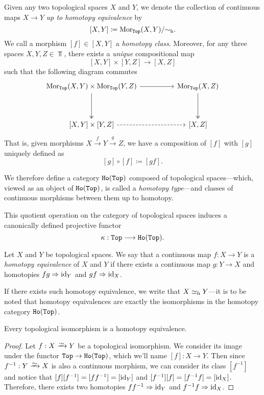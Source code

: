 Given any two topological spaces \(X\) and \(Y\), we denote the
collection of continuous maps \(X \to Y\) \emph{up to homotopy equivalence} by
\[
[X, Y] \coloneq \operatorname{Mor}_{{\texttt{Top}}}(X, Y)/{\sim_{\text{h}}}.
\]
We call a morphism \([f] \in [X, Y]\) a \emph{homotopy class}. Moreover, for any
three spaces \(X, Y, Z \in \Top\), there exists a \emph{unique} compositional
map
\[
[X, Y] \times [Y, Z] \longrightarrow [X, Z]
\]
such that the following diagram commutes
\[
\begin{tikzcd}
\Hom_{\Top}(X, Y) \times \Hom_{\Top}(Y, Z)
\ar[rr] \ar[dd, two heads]
&&\Hom_{\Top}(X, Z) \ar[dd, two heads]
\\ && \\
{[X, Y] \times [Y, Z]} \ar[rr, dashed]
&& {[X, Z]}
\end{tikzcd}
\]
That is, given morphisms \(X \xrightarrow{f} Y \xrightarrow{g} Z\), we have a
composition of \([f]\) with \([g]\) uniquely defined as
\[
[g] \circ [f] \coloneq [g f].
\]

\begin{definition}
\label{def:Ho(Top)}
We therefore define a category \({\texttt{Ho}(\texttt{Top})}\) composed of topological
spaces---which, viewed as an object of \({\texttt{Ho}(\texttt{Top})}\), is called a \emph{homotopy
  type}---and classes of continuous morphisms between them up to homotopy.
\end{definition}

This quotient operation on the category of topological spaces induces a
canonically defined projective functor
\[
\kappa: {\texttt{Top}} \longrightarrow {\texttt{Ho}(\texttt{Top})}.
\]

\begin{definition}
\label{def:homotopy-equivalence}
Let \(X\) and \(Y\) be topological spaces. We say that a continuous map
\(f: X \to Y\) is a \emph{homotopy equivalence} of \(X\) and \(Y\) if there
exists a continuous map \(g: Y \to X\) and homotopies \(f g \Rightarrow \operatorname{id}_Y\) and
\(g f \Rightarrow \operatorname{id}_X\).

If there exists such homotopy equivalence, we write that \(X \simeq_{\text{h}} Y\)---it
is to be noted that homotopy equivalences are exactly the isomorphisms in the
homotopy category \({\texttt{Ho}(\texttt{Top})}\).
\end{definition}

\begin{corollary}
\label{cor:homeomorphism-is-homotopy-equivalence}
Every topological isomorphism is a homotopy equivalence.
\end{corollary}

\begin{proof}
Let \(f: X \isoto Y\) be a topological isomorphism. We consider its image
under the functor \({\texttt{Top}} \to {\texttt{Ho}(\texttt{Top})}\), which we'll name \([f]: X \to Y\). Then
since \(f^{-1}: Y \isoto X\) is also a continuous morphism, we can consider its
class \([f^{-1}]\) and notice that \([f] [f^{-1}] = [f f^{-1}] = [\operatorname{id}_Y]\) and
\([f^{-1}] [f] = [f^{-1} f] = [\operatorname{id}_X]\). Therefore, there exists two homotopies
\(f f^{-1} \Rightarrow \operatorname{id}_Y\) and \(f^{-1} f \Rightarrow \operatorname{id}_X\).
\end{proof}

